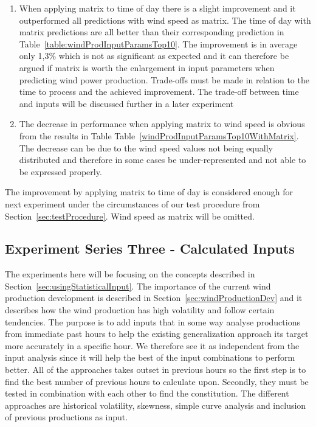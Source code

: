 \begin{enumerate}
\item When applying matrix to time of day there is a slight improvement and it outperformed all predictions with wind speed as matrix. The time of day with matrix predictions are all better than their corresponding prediction in Table~\ref{table:windProdInputParamsTop10}. The improvement is in average only 1,3\% which is not as significant as expected and it can therefore be argued if matrix is worth the enlargement in input parameters when predicting wind power production. Trade-offs must be made in relation to the time to process and the achieved improvement. The trade-off between time and inputs will be discussed further in a later experiment 
\item The decrease in performance when applying matrix to wind speed is obvious from the results in Table Table~\ref{windProdInputParamsTop10WithMatrix}. The decrease can be due to the wind speed values not being equally distributed and therefore in some cases be under-represented and not able to be expressed properly.  
\end{enumerate}

The improvement by applying matrix to time of day is considered enough for next experiment under the circumstances of our test procedure from Section~\ref{sec:testProcedure}. Wind speed as matrix will be omitted.

\subsection{Experiment Series Three - Calculated Inputs}
The experiments here will be focusing on the concepts described in Section~\ref{sec:usingStatisticalInput}. The importance of the current wind production development is described in Section~\ref{sec:windProductionDev} and it describes how the wind production has high volatility and follow certain tendencies. The purpose is to add inputs that in some way analyse productions from immediate past hours to help the existing generalization approach its target more accurately in a specific hour. We therefore see it as independent from the input analysis since it will help the best of the input combinations to perform better. All of the approaches takes outset in previous hours so the first step is to find the best number of previous hours to calculate upon. Secondly, they must be tested in combination with each other to find the constitution. The different approaches are historical volatility, skewness, simple curve analysis and inclusion of previous productions as input. 

